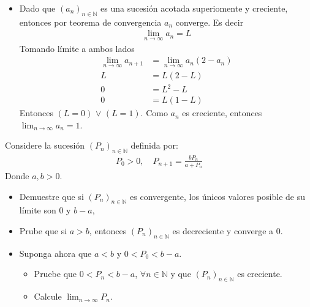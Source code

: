 \documentclass[12pt]{book}
\begin{document}
\begin{itemize}
    \item[\textbf{d)}] Dado que $(a_n)_{n \in \mathbb{N}}$ es una sucesión acotada superiomente y creciente, entonces por teorema de convergencia $a_n$ converge. Es decir 
    \begin{align*}
        \lim_{n \to \infty} a_n =L
    \end{align*}
    Tomando límite a ambos lados
    \begin{align*}
        \lim_{n \to \infty} a_{n+1}&=  \lim_{n \to \infty}a_n(2-a_n) \\
        L&=L(2-L) \\
        0&=L^2-L \\
        0&=L(1-L)
    \end{align*}
    Entonces $(L=0)$ $\vee$ $(L=1)$. Como $a_n$ es creciente, entonces $\displaystyle \lim_{n \to \infty} a_n = 1$.
\end{itemize}
\begin{prob}{}{}
    Considere la sucesión $(P_n)_{n \in \mathbb{N}}$ definida por:
    \begin{align*}
        P_0 >0, \quad P_{n+1}=\frac{bP_n}{a+P_n}
    \end{align*}
    Donde $a,b>0$.
    \begin{itemize}
        \item[\textbf{a)}] Demuestre que si $(P_n)_{n \in \mathbb{N}}$ es convergente, los únicos valores posible de su límite son $0$ y $b-a$,
        
        \item[\textbf{b)}] Prube que si $a>b$, entonces $(P_n)_{n \in \mathbb{N}}$ es decreciente y converge a $0$.
        
        \item[\textbf{c)}] Suponga ahora que $a<b$ y $0 < P_0 < b-a$.
        \begin{itemize}
            \item Pruebe que $0<P_n < b-a$, $\forall n \in \mathbb{N}$ y que $(P_n)_{n \in \mathbb{N}}$ es creciente.
            \item Calcule $\displaystyle \lim_{n \to \infty} P_n$.
        \end{itemize}
    \end{itemize}
\end{prob}
\end{document}
